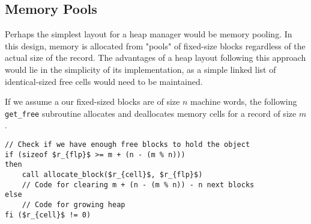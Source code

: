 




\subsection{Memory Pools}
Perhaps the simplest layout for a heap manager would be memory pooling. In this design, memory is allocated from "pools" of fixed-size blocks regardless of the actual size of the record. The advantages of a heap layout following this approach would lie in the simplicity of its implementation, as a simple linked list of identical-sized free cells would need to be maintained. 

If we assume a our fixed-sized blocks are of size $n$ machine words, the following \texttt{get\_free} subroutine allocates and deallocates memory cells for a record of size $m$.

\begin{lstlisting}[mathescape=true, caption={Allocating and deallocating records of size $m$ using block of a fixed size $n$. Code modified from~\cite{ha:heap}}, language=janus, style=basic,label={lst:memory-pool}]
// Check if we have enough free blocks to hold the object 
if (sizeof $r_{flp}$ >= m + (n - (m % n))) 
then
    call allocate_block($r_{cell}$, $r_{flp}$)
    // Code for clearing m + (n - (m % n)) - n next blocks 
else 
	// Code for growing heap
fi ($r_{cell}$ != 0)
\end{lstlisting}

